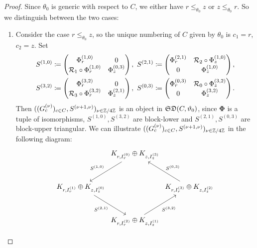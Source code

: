 \begin{proof}
    Since $\theta_0$ is generic with respect to $C$, we either have $r \leq_{\theta_0} z$ or $z \leq_{\theta_0} r$. So we distinguish between the two cases:
    \begin{enumerate}
        \item Consider the case $r \leq_{\theta_0} z$, so the unique numbering of $C$ given by $\theta_0$ is $c_1 = r$, $c_2 = z$. Set 
        \begin{align*}
            S^{(1,0)} & \coloneqq 
        \begin{pmatrix}
            \Phi^{(1,0)}_r & 0\\
              \mathcal{R}_1 \circ \Phi_r^{(1,0)}& \Phi_z^{(0,3)}
        \end{pmatrix},~
        S^{(2,1)} \coloneqq 
        \begin{pmatrix}
            \Phi^{(2,1)}_r &  \mathcal{R}_2 \circ \Phi^{(1,0)}_z\\
            0 & \Phi_z^{(1,0)}
        \end{pmatrix}, \\
         S^{(3,2)} & \coloneqq 
        \begin{pmatrix}
            \Phi^{(3,2)}_r & 0\\
             \mathcal{R}_3 \circ \Phi_r^{(3,2)} & \Phi_z^{(2,1)}
        \end{pmatrix},~
        S^{(0,3)} \coloneqq 
        \begin{pmatrix}
            \Phi^{(0,3)}_r & \mathcal{R}_0 \circ \Phi^{(3,2)}_z\\
           0 & \Phi_z^{(3,2)}
        \end{pmatrix}.
        \end{align*}
        Then $((G_c^{(\nu)})_{c \in C}, S^{(\nu+1,\nu)})_{\nu \in \mathbb{Z}/4\mathbb{Z}}$ is an object in $\mathfrak{SD}(C,\vartheta_0)$, since $\bm{\Phi}$ is a tuple of isomorphisms, $S^{(1,0)},S^{(3,2)}$ are block-lower and $S^{(2,1)},S^{(0,3)}$ are block-upper triangular. We can illustrate $((G_c^{(\nu)})_{c \in C}, S^{(\nu+1,\nu)})_{\nu \in \mathbb{Z}/4\mathbb{Z}}$ in the following diagram:
        \[
         \begin{tikzcd}[row sep=1cm, column sep=0cm]
         & K_{r,I_r^{(0)}} \oplus K_{z,I_z^{(3)}} \arrow[dl, "S^{(1,0)}"'] & \\
        K_{r,I_r^{(1)}} \oplus K_{z,I_z^{(0)}} \arrow[dr, "S^{(2,1)}"'] & & K_{r,I_r^{(3)}} \oplus K_{z,I_z^{(2)}} \arrow[ul, "S^{(0,3)}" above right] \\
        & K_{r,I_r^{(2)}} \oplus K_{z,I_z^{(1)}}\arrow[ur, "S^{(3,2)}" below right] &
        \end{tikzcd}
\]
\end{enumerate}
\end{proof}
